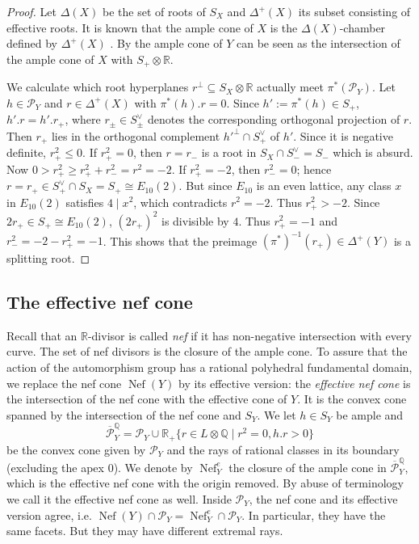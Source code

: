 \documentclass{amsart}
\theoremstyle{definition}
\theoremstyle{plain}
\DeclareMathOperator{\Nef}{Nef}
\newcommand{\QQ}{\mathbb{Q}}
\newcommand{\RR}{\mathbb{R}}
\renewcommand{\P}{\mathcal{P}}
\newcommand{\Pbar}{\overline{\P}^\mathbb{Q}}
\begin{document}
\begin{proof}
Let $\Delta(X)$ be the set of roots of $S_X$ and \(\Delta^+(X)\) its subset consisting of effective roots.
It is known \cite[VIII (3.9)]{bhpv:compact-complex-surfaces} that the ample cone of $X$ is the $\Delta(X)$-chamber defined by $\Delta^+(X)$ .
By  the ample cone of $Y$ can be seen as the intersection of the ample cone of $X$ with $S_+\otimes \RR$.

We calculate which root hyperplanes $r^\perp\subseteq S_X\otimes\RR$ actually meet $\pi^*(\P_Y)$.
Let $h \in \P_Y$ and $r \in \Delta^+(X)$ with $\pi^*(h).r=0$. Since $h' := \pi^*(h) \in S_+$, $h'.r = h'.r_+$, where
$r_\pm \in S_\pm^\vee$ denotes the corresponding orthogonal projection of $r$.
Then $r_+$ lies in the orthogonal complement $h'^\perp \cap S_+^\vee$ of $h'$. Since it is negative definite, $r_+^2 \leq 0$. If $r_+^2=0$, then $r=r_-$ is a root in $S_X \cap S_-^\vee = S_-$ which is absurd.
Now $0 > r_+^2 \geq r_+^2+r_-^2= r^2 = -2$.
If $r_+^2=-2$, then $r_-^2=0$; hence $r=r_+ \in S_+^\vee\cap S_X = S_+ \cong E_{10}(2)$. But since $E_{10}$ is an even lattice, any class $x$ in $E_{10}(2)$ satisfies $4 \mid x^2$, which contradicts $r^2=-2$. Thus $r_+^2>-2$.
Since $2r_+ \in S_+\cong E_{10}(2)$,  $(2r_+)^2$ is divisible by $4$. Thus $r_+^2=-1$
and $r_-^2 =-2 - r_+^2= -1$. This shows that the preimage $(\pi^*)^{-1}(r_+) \in \Delta^+(Y)$ is a splitting root.
\end{proof}

\subsection{The effective nef  cone}
Recall that an $\RR$-divisor is called \emph{nef} if it has non-negative intersection with every curve. The set of nef divisors is the closure of the ample cone.
To assure that the action of the automorphism group has a rational polyhedral fundamental domain,
we replace the nef cone $\Nef(Y)$ by its effective version:
the \emph{effective nef cone} is the intersection of the nef cone with the effective cone of $Y$.
It is the convex cone spanned by the intersection of the nef cone and $S_Y$.
We let $h\in S_Y$ be ample and
\[\Pbar_Y = \P_Y \cup \RR_+ \{r \in L \otimes \QQ \mid r^2 = 0, h.r>0\}\]
be the convex cone given by $\P_Y$ and the rays of rational classes in its boundary (excluding the apex $0$).
We denote by $\Nef^{e}_Y$ the closure of the ample cone in $\Pbar_Y$,
which is the effective nef cone with the origin removed. By abuse of terminology we call it the effective nef cone as well.
Inside $\P_Y$, the nef cone and its effective version agree, i.e.
$\Nef(Y) \cap \P_Y = \Nef^e_Y \cap \P_Y$. In particular, they have the same facets. But they may have different extremal rays.
\end{document}
